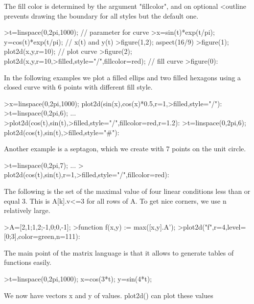 \documentclass[a4paper,10pt]{article}
\begin{document}
\begin{eulernotebook}
\begin{eulercomment}
\begin{eulercomment}
\begin{eulercomment}
\begin{eulercomment}
\begin{eulercomment}
The fill color is determined by the argument "fillcolor", and on optional \textless{}outline
prevents drawing the boundary for all styles but the default one.
\end{eulercomment}
\begin{eulerprompt}
>t=linspace(0,2pi,1000); // parameter for curve
>x=sin(t)*exp(t/pi); y=cos(t)*exp(t/pi); // x(t) and y(t)
>figure(1,2); aspect(16/9)
>figure(1); plot2d(x,y,r=10); // plot curve
>figure(2); plot2d(x,y,r=10,>filled,style="/",fillcolor=red); // fill curve
>figure(0):
\end{eulerprompt}
\begin{eulercomment}
In the following examples we plot a filled ellips and two filled hexagons using a
closed curve with 6 points with different fill style.
\end{eulercomment}
\begin{eulerprompt}
>x=linspace(0,2pi,1000); plot2d(sin(x),cos(x)*0.5,r=1,>filled,style="/"):
>t=linspace(0,2pi,6); ...
>plot2d(cos(t),sin(t),>filled,style="/",fillcolor=red,r=1.2):
>t=linspace(0,2pi,6); plot2d(cos(t),sin(t),>filled,style="#"):
\end{eulerprompt}
\begin{eulercomment}
Another example is a septagon, which we create with 7 points on the unit circle.
\end{eulercomment}
\begin{eulerprompt}
>t=linspace(0,2pi,7);  ...
> plot2d(cos(t),sin(t),r=1,>filled,style="/",fillcolor=red):
\end{eulerprompt}
\begin{eulercomment}
The following is the set of the maximal value of four linear conditions less than or
equal 3. This is A[k].v\textless{}=3 for all rows of A. To get nice corners, we use n relatively
large.
\end{eulercomment}
\begin{eulerprompt}
>A=[2,1;1,2;-1,0;0,-1];
>function f(x,y) := max([x,y].A');
>plot2d("f",r=4,level=[0;3],color=green,n=111):
\end{eulerprompt}
\begin{eulercomment}
The main point of the matrix language is that it allows to generate tables of
functions easily.
\end{eulercomment}
\begin{eulerprompt}
>t=linspace(0,2pi,1000); x=cos(3*t); y=sin(4*t);
\end{eulerprompt}
\begin{eulercomment}
We now have vectors x and y of values. plot2d() can plot these values\\

\end{eulercomment}
\end{eulercomment}
\end{eulercomment}
\end{eulercomment}
\end{eulercomment}
\end{eulernotebook}
\end{document}
